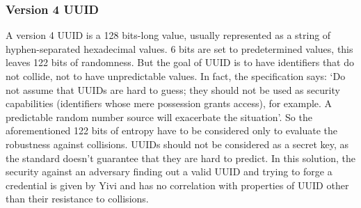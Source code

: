 \documentclass{report}
\begin{document}
\subsubsection{Version 4 UUID}\label{uuid_collision_discussion}
A version 4 UUID is a 128 bits-long value, usually represented as a string of hyphen-separated hexadecimal values. 6 bits are set to predetermined values, this leaves 122 bits of
randomness. But the goal of UUID is to have identifiers that do not collide, not to have unpredictable values. In fact, the specification says: \enquote*{Do not assume that UUIDs are 
hard to guess; they should not be used as security capabilities (identifiers whose mere possession grants access), for example. A predictable random number source will exacerbate the
situation}. So the aforementioned 122 bits of entropy have to be considered only to evaluate the robustness against collisions. UUIDs should not be considered as a secret key, as
the standard doesn't guarantee that they are hard to predict. In this solution, the security against an adversary finding out a valid UUID and trying to forge a credential is given by 
Yivi and has no correlation with properties of UUID other than their resistance to collisions.
\end{document}
